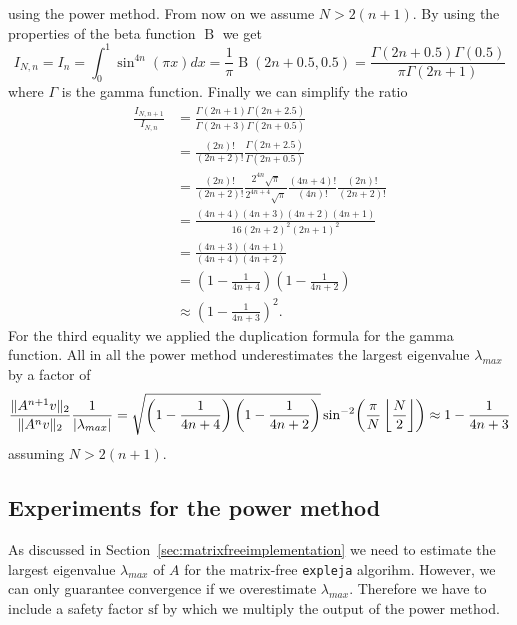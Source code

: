 \documentclass{scrartcl}
\begin{document}
	using the power method. From now on we assume $N > 2(n+1)$. By using the properties of the beta function $\operatorname{B}$ we get
	\[
	I_{N,n} = I_{n} = \int_{0}^{1} \sin^{4n}(\pi x)dx = \frac{1}{\pi} \operatorname{B}(2n+0.5,0.5) = \frac{\Gamma(2n + 0.5)\Gamma(0.5)}{\pi \Gamma(2n + 1)}
	\]
	\noindent where $\Gamma$ is the gamma function. Finally we can simplify the ratio
	\begin{align*}
		\frac{I_{N,n+1}}{I_{N,n}} &=   
		\frac{\Gamma(2n + 1)\Gamma(2n + 2.5)}{\Gamma(2n + 3)\Gamma(2n + 0.5)} \\&= 
		\frac{(2n)!}{(2n+2)!}
		\frac{\Gamma(2n + 2.5)}{\Gamma(2n + 0.5)}\\&=
		\frac{(2n)!}{(2n+2)!}
		\frac{2^{4n}\sqrt\pi}{2^{4n+4}\sqrt\pi}
		\frac{(4n+4)!}{(4n)!}
		\frac{(2n)!}{(2n+2)!} \\&=
		\frac{(4n+4)(4n+3)(4n+2)(4n+1)}{16(2n+2)^2(2n+1)^2} \\&=
		\frac{(4n+3)(4n+1)}{(4n+4)(4n+2)}\\&=
		\left(1-\frac{1}{4n+4}\right)\left(1-\frac{1}{4n+2}\right)\\&\approx
		\left(1-\frac{1}{4n+3}\right)^2.		
	\end{align*}
	For the third equality we applied the duplication formula for the gamma function. All in all the power method underestimates the largest eigenvalue $\lambda_{max}$ by a factor of 
	\[
		\frac{\lVert A^{n+1}v\rVert_2}{\lVert A^{n}v\rVert_2}\frac{1}{\lvert\lambda_{max}\rvert} =
		\sqrt{\left(1-\frac{1}{4n+4}\right)\left(1-\frac{1}{4n+2}\right)}\sin^{-2}\!\left(\frac{\pi}{N}\left\lfloor\frac{N}{2}\right\rfloor\right) \approx 1-\frac{1}{4n+3}
	\]
	assuming $N>2(n+1)$. 
\subsection{Experiments for the power method}
	As discussed in Section~\ref{sec:matrixfreeimplementation} we need to estimate the largest eigenvalue $\lambda_{max}$ of $A$ for the matrix-free \texttt{expleja} algorihm. However, we can only guarantee convergence if we overestimate $\lambda_{max}$. Therefore we have to include a safety factor $\text{sf}$ by which we multiply the output of the power method. 
	
\end{document}
